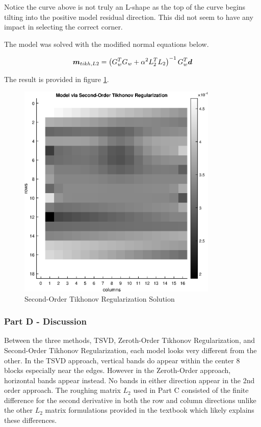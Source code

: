  Notice the curve above is not truly an L-shape as the top of the curve begins tilting into the positive model residual direction. This did not seem to have any impact in selecting the correct corner.
 
The model was solved with the modified normal equations below.

\begin{align*}
	\boldsymbol{m}_{tikh,L2} = \left(G_w^T G_w + \alpha^2 L_2^T L_2\right)^{-1} G_w^T \boldsymbol{d}
\end{align*}

The result is provided in figure \ref{fig: prob3 partC model}.
 
 \begin{figure}[h] 
 	\centering
 	\includegraphics[width=0.85\textwidth]{./images/prob3_partC_m_tikh.eps}
 	\caption{Second-Order Tikhonov Regularization Solution}
 	\label{fig: prob3 partC model}
 \end{figure}
 \FloatBarrier
 

\subsubsection{Part D - Discussion}

Between the three methods, TSVD, Zeroth-Order Tikhonov Regularization, and Second-Order Tikhonov Regularization, each model looks very different from the other. In the TSVD approach, vertical bands do appear within the center 8 blocks especially near the edges. However in the Zeroth-Order approach, horizontal bands appear instead. No bands in either direction appear in the 2nd order approach. The roughing matrix $L_2$ used in Part C consisted of the finite difference for the second derivative in both the row and column directions unlike the other $L_2$ matrix formulations provided in the textbook which likely explains these differences.



